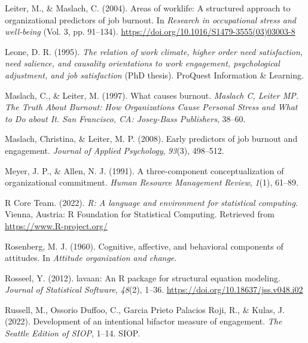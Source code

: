 \documentclass[
  man]{apa6}
\newlength{\cslhangindent}
\newlength{\cslentryspacingunit} %
\newenvironment{CSLReferences}[2] %
 {%
  \setlength{\parindent}{0pt}
  \ifodd #1
  \let\oldpar\par
  \def\par{\hangindent=\cslhangindent\oldpar}
  \fi
  \setlength{\parskip}{#2\cslentryspacingunit}
 }%
 {}
\begin{document}
\begin{CSLReferences}{1}{0}
\leavevmode{}%
Leiter, M., \& Maslach, C. (2004). Areas of worklife: A structured approach to organizational predictors of job burnout. In \emph{Research in occupational stress and well-being} (Vol. 3, pp. 91--134). \url{https://doi.org/10.1016/S1479-3555(03)03003-8}

\leavevmode{}%
Leone, D. R. (1995). \emph{The relation of work climate, higher order need satisfaction, need salience, and causality orientations to work engagement, psychological adjustment, and job satisfaction} (PhD thesis). ProQuest Information \& Learning.

\leavevmode{}%
Maslach, C., \& Leiter, M. (1997). What causes burnout. \emph{Maslach C, Leiter MP. The Truth About Burnout: How Organizations Cause Personal Stress and What to Do about It. San Francisco, CA: Josey-Bass Publishers}, 38--60.

\leavevmode{}%
Maslach, Christina, \& Leiter, M. P. (2008). Early predictors of job burnout and engagement. \emph{Journal of Applied Psychology}, \emph{93}(3), 498--512.

\leavevmode{}%
Meyer, J. P., \& Allen, N. J. (1991). A three-component conceptualization of organizational commitment. \emph{Human Resource Management Review}, \emph{1}(1), 61--89.

\leavevmode{}%
R Core Team. (2022). \emph{R: A language and environment for statistical computing}. Vienna, Austria: R Foundation for Statistical Computing. Retrieved from \url{https://www.R-project.org/}

\leavevmode{}%
Rosenberg, M. J. (1960). Cognitive, affective, and behavioral components of attitudes. In \emph{Attitude organization and change}.

\leavevmode{}%
Rosseel, Y. (2012). {lavaan}: An {R} package for structural equation modeling. \emph{Journal of Statistical Software}, \emph{48}(2), 1--36. \url{https://doi.org/10.18637/jss.v048.i02}

\leavevmode{}%
Russell, M., Ossorio Duffoo, C., Garcia Prieto Palacios Roji, R., \& Kulas, J. (2022). Development of an intentional bifactor measure of engagement. \emph{The Seattle Edition of SIOP}, 1--14. SIOP.


\end{CSLReferences}
\end{document}
